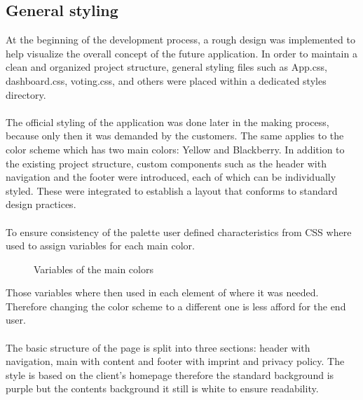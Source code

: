 \documentclass[a4paper,12pt]{report}
\begin{document}
\subsection{General styling}
At the beginning of the development process, a rough design was implemented to help visualize the overall concept of the future application. In order to maintain a clean and organized project structure, general styling files such as App.css, dashboard.css, voting.css, and others were placed within a dedicated styles directory.\\\\
The official styling of the application was done later in the making process, because only then it was demanded by the customers. The same applies to the color scheme which has two main colors: Yellow and Blackberry. In addition to the existing project structure, custom components such as the header with navigation and the footer were introduced, each of which can be individually styled. These were integrated to establish a layout that conforms to standard design practices.\\\\
To ensure consistency of the palette user defined characteristics from CSS where used to assign variables for each main color. \parencite{csscolorvariables}
\begin{figure}[h!]
	\caption{Variables of the main colors}
	\label{fig:user_defined_characteristics}
\end{figure}
Those variables where then used in each element of where it was needed. Therefore changing the color scheme to a different one is less afford for the end user. \\ \\
The basic structure of the page is split into three sections: header with navigation, main with content and footer with imprint and privacy policy. The style is based on the client's homepage therefore the standard background is purple but the contents background it still is white to ensure readability. \parencite{lmppage}
\end{document}
